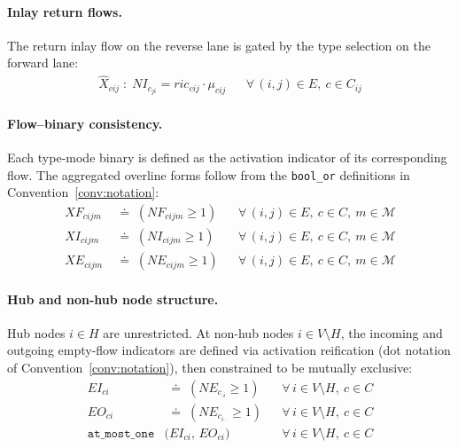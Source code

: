 
\paragraph{Inlay return flows.}
The return inlay flow on the reverse lane is gated by the type
selection on the forward lane:
%
\begin{align}
  \hat{X}_{cij} \;:\; NI_{c}_{ji}
    = ric_{cij}\cdot\mu_{cij}
  && \forall\,(i,j)\in E,\ c\in C_{ij}
  \label{eq:inlay}
\end{align}


\paragraph{Flow--binary consistency.}
Each type-mode binary is defined as the activation indicator of
its corresponding flow. The aggregated overline forms follow from
the \texttt{bool\_or} definitions in Convention~\ref{conv:notation}:
%
\begin{align}
  XF_{cijm} &\;\doteq\; (NF_{cijm} \geq 1)
  && \forall\,(i,j)\in E,\ c\in C,\ m\in\mathcal{M}
  \label{eq:binary-full}\\
  XI_{cijm} &\;\doteq\; (NI_{cijm} \geq 1)
  && \forall\,(i,j)\in E,\ c\in C,\ m\in\mathcal{M}
  \label{eq:binary-inlay}\\
  XE_{cijm} &\;\doteq\; (NE_{cijm} \geq 1)
  && \forall\,(i,j)\in E,\ c\in C,\ m\in\mathcal{M}
  \label{eq:binary-empty}
\end{align}


\paragraph{Hub and non-hub node structure.}
Hub nodes $i\in H$ are unrestricted. At non-hub nodes
$i\in V\setminus H$, the incoming and outgoing empty-flow
indicators are defined via activation reification (dot notation
of Convention~\ref{conv:notation}), then constrained to be
mutually exclusive:
%
\begin{align}
  EI_{ci}
    &\;\doteq\; (NE_{c}_{\cdot i} \geq 1)
  && \forall\, i\in V\setminus H,\ c\in C
  \label{eq:hub-EI}\\
  EO_{ci}
    &\;\doteq\; (NE_{c}_{i\cdot} \geq 1)
  && \forall\, i\in V\setminus H,\ c\in C
  \label{eq:hub-EO}\\
  \texttt{at\_most\_one}&\bigl(EI_{ci},\, EO_{ci}\bigr)
  && \forall\, i\in V\setminus H,\ c\in C
  \label{eq:non-hub}
\end{align}

